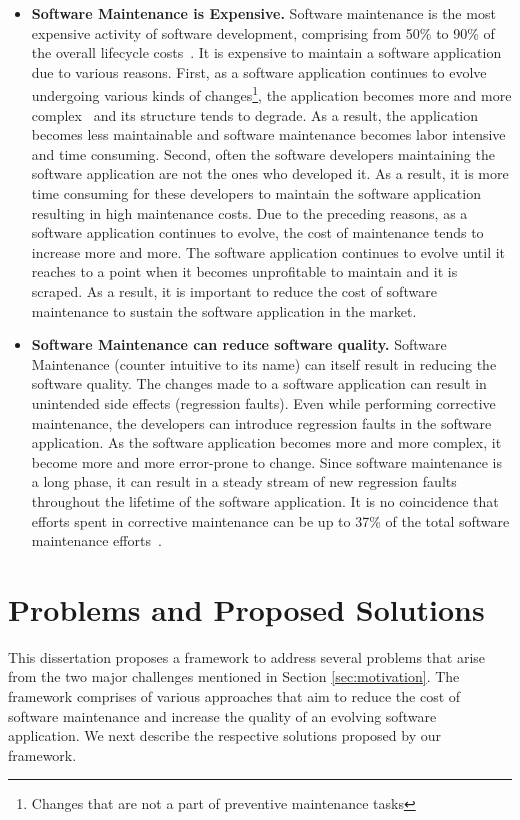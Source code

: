 
\begin{itemize}
\item{\textbf{Software Maintenance is Expensive.}} 
Software maintenance is the most expensive activity of software development, comprising from 
50\% to 90\% of the overall lifecycle costs~\cite{schneidewind:1987}. It is expensive to 
maintain a software application due to various reasons. First, as a software application continues to evolve 
undergoing various kinds of changes\footnote{Changes that are not a part of preventive maintenance tasks}, 
the application becomes more and more complex~\cite{lehman:1985} and its structure tends to degrade. 
As a result, the application becomes less maintainable and software maintenance becomes labor intensive and time consuming. 
Second, often the software developers maintaining the software application are not the ones who developed it. 
As a result, it is more time consuming for these developers to maintain the software application resulting in high maintenance costs.
 Due to the preceding reasons, as a software application continues to evolve, the cost of maintenance tends to increase more and more. 
 The software application continues to evolve until it reaches to a point when it becomes unprofitable to maintain and it is scraped. 
 As a result, it is important to reduce the cost of software maintenance to sustain the software application in the market.

\item{\textbf{Software Maintenance can reduce software quality.}} Software Maintenance (counter intuitive to its name) can itself result in reducing the software quality. The changes made to a software application can result in unintended side effects (regression faults). Even while performing corrective maintenance, the developers can introduce regression faults in the software application. 
As the software application becomes more and more complex, it become more and more error-prone to change.
Since software maintenance is a long phase, it can result in a steady stream of new regression faults throughout the lifetime of the software application. 
It is no coincidence that efforts spent in corrective maintenance can be up to 37\% of the total software maintenance efforts~\cite{study1, study2, study3, study4, Mockus:2000}.

\end{itemize}


\section{Problems and Proposed Solutions}
\label{sec:problems}
This dissertation proposes a framework to address several problems that arise from the two major challenges mentioned in Section \ref{sec:motivation}. The framework comprises of various approaches that aim to 
reduce the cost of software maintenance and increase the quality of an evolving software  application. 
We next describe the respective solutions proposed by our framework.

